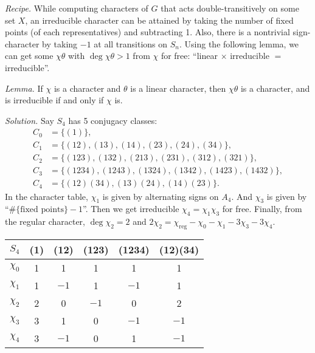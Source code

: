 \documentclass{mathproblems}
\begin{document}
\begin{questions}

{\color{violet}
\textit{Recipe.} While computing characters of $G$ that acts double-transitively on some set $X$, an irreducible character can be attained by taking the number of fixed points (of each representatives) and subtracting 1. Also, there is a nontrivial sign-character by taking $-1$ at all transitions on $S_n$. Using the following lemma, we can get some $\chi\theta$ with $\deg\chi\theta>1$ from $\chi$ for free: ``linear $\times$ irreducible $=$ irreducible''.

\textit{Lemma.} If $\chi$ is a character and $\theta$ is a linear character, then $\chi\theta$ is a character, and is irreducible if and only if $\chi$ is.
}

\textit{Solution.} Say $S_4$ has 5 conjugacy classes:
$$
\begin{aligned}
C_0&=\{(1)\},\\
C_1&=\{(12),(13),(14),(23),(24),(34)\},\\
C_2&=\{(123),(132),(213),(231),(312),(321)\},\\
C_3&=\{(1234),(1243),(1324),(1342),(1423),(1432)\},\\
C_4&=\{(12)(34),(13)(24),(14)(23)\}.
\end{aligned}
$$
In the character table, $\chi_1$ is given by alternating signs on $A_4$. And $\chi_3$ is given by ``$\#\{\text{fixed points}\}-1$''. Then we get irreducible $\chi_4=\chi_1\chi_3$ for free. Finally, from the regular character, $\deg \chi_2=2$ and $2\chi_2=\chi_{\mathrm{reg}}-\chi_0-\chi_1-3\chi_3-3\chi_4$.
\begin{center}
\begin{tabular}{c|ccccc}
$S_4$ & (1) & (12) & (123) & (1234) & (12)(34)\\
\hline
$\chi_0$ & 1 & 1 & 1 & 1 & 1 \\
$\chi_1$ & 1 & $-1$ & 1 & $-1$ & 1 \\
$\chi_2$ & 2 & 0 & $-1$ & 0 & 2 \\
$\chi_3$ & 3 & 1 & 0 & $-1$ & $-1$ \\
$\chi_4$ & 3 & $-1$ & 0 & 1 & $-1$ \\
\end{tabular}
\end{center}



\end{questions}
\end{document}
